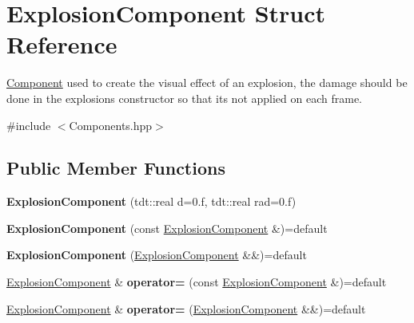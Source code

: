 \hypertarget{struct_explosion_component}{}\section{Explosion\+Component Struct Reference}
\label{struct_explosion_component}


\hyperlink{struct_component}{Component} used to create the visual effect of an explosion, the damage should be done in the explosion\textquotesingle{}s constructor so that it\textquotesingle{}s not applied on each frame.  




{\ttfamily \#include $<$Components.\+hpp$>$}

\subsection*{Public Member Functions}
\begin{DoxyCompactItemize}
\item 
{\bfseries Explosion\+Component} (tdt\+::real d=0.f, tdt\+::real rad=0.f)\hypertarget{struct_explosion_component_ae83e0ea9dfc9580a5443ca8cc0836522}{}\label{struct_explosion_component_ae83e0ea9dfc9580a5443ca8cc0836522}

\item 
{\bfseries Explosion\+Component} (const \hyperlink{struct_explosion_component}{Explosion\+Component} \&)=default\hypertarget{struct_explosion_component_a359fb260499fab4e45b9e47e114b4e2c}{}\label{struct_explosion_component_a359fb260499fab4e45b9e47e114b4e2c}

\item 
{\bfseries Explosion\+Component} (\hyperlink{struct_explosion_component}{Explosion\+Component} \&\&)=default\hypertarget{struct_explosion_component_ac3edad4b0610493d4d8c667c096a6266}{}\label{struct_explosion_component_ac3edad4b0610493d4d8c667c096a6266}

\item 
\hyperlink{struct_explosion_component}{Explosion\+Component} \& {\bfseries operator=} (const \hyperlink{struct_explosion_component}{Explosion\+Component} \&)=default\hypertarget{struct_explosion_component_ae55cb8d9a7f3db1c1c7f0750de17a9b4}{}\label{struct_explosion_component_ae55cb8d9a7f3db1c1c7f0750de17a9b4}

\item 
\hyperlink{struct_explosion_component}{Explosion\+Component} \& {\bfseries operator=} (\hyperlink{struct_explosion_component}{Explosion\+Component} \&\&)=default\hypertarget{struct_explosion_component_a27a2332fb4795cb1babf0f6244517b1b}{}\label{struct_explosion_component_a27a2332fb4795cb1babf0f6244517b1b}

\end{DoxyCompactItemize}
